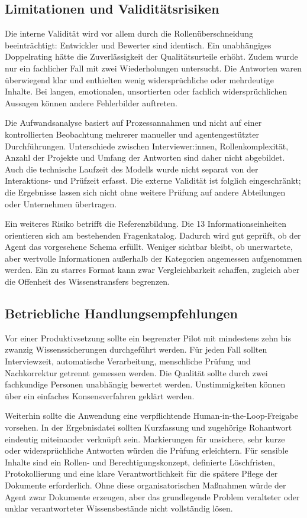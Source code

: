 \documentclass[
  10pt,
  ngerman,
  a4paper,
  toc=graduated,
  numbers=noenddot,
  headings=standardclasses,
  nonumberlist
]{scrartcl}
\begin{document}
\subsection{Limitationen und Validitätsrisiken}

Die interne Validität wird vor allem durch die Rollenüberschneidung beeinträchtigt: Entwickler und Bewerter sind identisch. Ein unabhängiges Doppelrating hätte die Zuverlässigkeit der Qualitätsurteile erhöht. Zudem wurde nur ein fachlicher Fall mit zwei Wiederholungen untersucht. Die Antworten waren überwiegend klar und enthielten wenig widersprüchliche oder mehrdeutige Inhalte. Bei langen, emotionalen, unsortierten oder fachlich widersprüchlichen Aussagen können andere Fehlerbilder auftreten.

Die Aufwandsanalyse basiert auf Prozessannahmen und nicht auf einer kontrollierten Beobachtung mehrerer manueller und agentengestützter Durchführungen. Unterschiede zwischen Interviewer:innen, Rollenkomplexität, Anzahl der Projekte und Umfang der Antworten sind daher nicht abgebildet. Auch die technische Laufzeit des Modells wurde nicht separat von der Interaktions- und Prüfzeit erfasst. Die externe Validität ist folglich eingeschränkt; die Ergebnisse lassen sich nicht ohne weitere Prüfung auf andere Abteilungen oder Unternehmen übertragen.

Ein weiteres Risiko betrifft die Referenzbildung. Die 13 Informationseinheiten orientieren sich am bestehenden Fragenkatalog. Dadurch wird gut geprüft, ob der Agent das vorgesehene Schema erfüllt. Weniger sichtbar bleibt, ob unerwartete, aber wertvolle Informationen außerhalb der Kategorien angemessen aufgenommen werden. Ein zu starres Format kann zwar Vergleichbarkeit schaffen, zugleich aber die Offenheit des Wissenstransfers begrenzen.

\subsection{Betriebliche Handlungsempfehlungen}

Vor einer Produktivsetzung sollte ein begrenzter Pilot mit mindestens zehn bis zwanzig Wissenssicherungen durchgeführt werden. Für jeden Fall sollten Interviewzeit, automatische Verarbeitung, menschliche Prüfung und Nachkorrektur getrennt gemessen werden. Die Qualität sollte durch zwei fachkundige Personen unabhängig bewertet werden. Unstimmigkeiten können über ein einfaches Konsensverfahren geklärt werden.

Weiterhin sollte die Anwendung eine verpflichtende Human-in-the-Loop-Freigabe vorsehen. In der Ergebnisdatei sollten Kurzfassung und zugehörige Rohantwort eindeutig miteinander verknüpft sein. Markierungen für unsichere, sehr kurze oder widersprüchliche Antworten würden die Prüfung erleichtern. Für sensible Inhalte sind ein Rollen- und Berechtigungskonzept, definierte Löschfristen, Protokollierung und eine klare Verantwortlichkeit für die spätere Pflege der Dokumente erforderlich. Ohne diese organisatorischen Maßnahmen würde der Agent zwar Dokumente erzeugen, aber das grundlegende Problem veralteter oder unklar verantworteter Wissensbestände nicht vollständig lösen.
\end{document}
